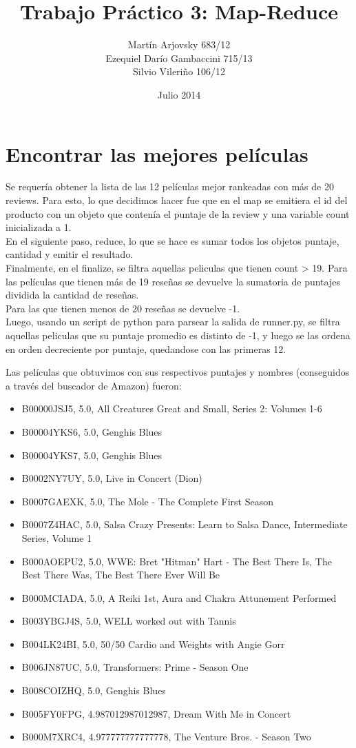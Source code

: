 \documentclass{article}
\title{Trabajo Pr\'actico 3: Map-Reduce}
\author{Mart\'{i}n Arjovsky 683/12 \\ Ezequiel Dar\'io Gambaccini 715/13 \\ Silvio Vileri\~no 106/12}
\date{Julio 2014}
\begin{document}
\maketitle

\section{Encontrar las mejores pel\'iculas}

\indent Se requer\'ia obtener la lista de las 12 pel\'iculas mejor rankeadas con m\'as de 20 reviews. Para esto, lo que decidimos hacer fue que en el map se emitiera el id del producto con un objeto que conten\'ia el puntaje de la review y una variable count inicializada a 1.
\\\indent En el siguiente paso, reduce, lo que se hace es sumar todos los objetos {puntaje, cantidad} y emitir el resultado.
\\\indent Finalmente, en el finalize, se filtra aquellas peliculas que tienen count > 19. Para las pel\'iculas que tienen m\'as de 19 rese\~nas se devuelve la sumatoria de puntajes dividida la cantidad de rese\~nas.
\\\indent Para las que tienen menos de 20 rese\~nas se devuelve -1.
\\\indent Luego, usando un script de python para parsear la salida de runner.py, se filtra aquellas peliculas que su puntaje promedio es distinto de -1, y luego se las ordena en orden decreciente por puntaje, quedandose con las primeras 12.

Las pel\'iculas que obtuvimos con sus respectivos puntajes y nombres (conseguidos a trav\'es del buscador de Amazon) fueron:

\begin{itemize}
\item B00000JSJ5, 5.0, All Creatures Great and Small, Series 2: Volumes 1-6
\item B00004YKS6, 5.0, Genghis Blues
\item B00004YKS7, 5.0, Genghis Blues
\item B0002NY7UY, 5.0, Live in Concert (Dion)
\item B0007GAEXK, 5.0, The Mole - The Complete First Season
\item B0007Z4HAC, 5.0, Salsa Crazy Presents: Learn to Salsa Dance, Intermediate Series, Volume 1
\item B000AOEPU2, 5.0, WWE: Bret "Hitman" Hart - The Best There Is, The Best There Was, The Best There Ever Will Be
\item B000MCIADA, 5.0, A Reiki 1st, Aura and Chakra Attunement Performed
\item B003YBGJ4S, 5.0, WELL worked out with Tannis
\item B004LK24BI, 5.0, 50/50 Cardio and Weights with Angie Gorr
\item B006JN87UC, 5.0, Transformers: Prime - Season One
\item B008COIZHQ, 5.0, Genghis Blues
\item B005FY0FPG, 4.987012987012987, Dream With Me in Concert
\item B000M7XRC4, 4.977777777777778, The Venture Bros. - Season Two
\end{itemize}
\end{document}
